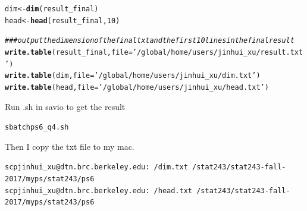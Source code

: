 \documentclass{article}\usepackage[]{graphicx}\usepackage[]{color}
\makeatletter
\newcommand{\hlnum}[1]{\textcolor[rgb]{0.686,0.059,0.569}{#1}}%
\newcommand{\hlstr}[1]{\textcolor[rgb]{0.192,0.494,0.8}{#1}}%
\newcommand{\hlcom}[1]{\textcolor[rgb]{0.678,0.584,0.686}{\textit{#1}}}%
\newcommand{\hlstd}[1]{\textcolor[rgb]{0.345,0.345,0.345}{#1}}%
\newcommand{\hlkwb}[1]{\textcolor[rgb]{0.69,0.353,0.396}{#1}}%
\newcommand{\hlkwc}[1]{\textcolor[rgb]{0.333,0.667,0.333}{#1}}%
\newcommand{\hlkwd}[1]{\textcolor[rgb]{0.737,0.353,0.396}{\textbf{#1}}}%
\newenvironment{kframe}{%
 \def\at@end@of@kframe{}%
 \ifinner\ifhmode%
  \def\at@end@of@kframe{\end{minipage}}%
  \begin{minipage}{\columnwidth}%
 \fi\fi%
 \def\FrameCommand##1{\hskip\@totalleftmargin \hskip-\fboxsep
 \colorbox{shadecolor}{##1}\hskip-\fboxsep
     \hskip-\linewidth \hskip-\@totalleftmargin \hskip\columnwidth}%
 \MakeFramed {\advance\hsize-\width
   \@totalleftmargin\z@ \linewidth\hsize
   \@setminipage}}%
 {\par\unskip\endMakeFramed%
 \at@end@of@kframe}
\newenvironment{knitrout}{}{} %
\makeatother
\begin{document}
\begin{knitrout}
\begin{kframe}
\begin{alltt}
\hlstd{dim}\hlkwb{<-}\hlkwd{dim}\hlstd{(result_final)}
\hlstd{head}\hlkwb{<-}\hlkwd{head}\hlstd{(result_final,}\hlnum{10}\hlstd{)}

\hlcom{###output the dimension of the final txt and the first 10 lines in the final result}
\hlkwd{write.table}\hlstd{(result_final,}\hlkwc{file}\hlstd{=}\hlstr{'/global/home/users/jinhui_xu/result.txt'}\hlstd{)}
\hlkwd{write.table}\hlstd{(dim,}\hlkwc{file}\hlstd{=}\hlstr{'/global/home/users/jinhui_xu/dim.txt'}\hlstd{)}
\hlkwd{write.table}\hlstd{(head,}\hlkwc{file}\hlstd{=}\hlstr{'/global/home/users/jinhui_xu/head.txt'}\hlstd{)}
\end{alltt}
\end{kframe}
\end{knitrout}

Run .sh in savio to get the result
\begin{knitrout}
\color{fgcolor}\begin{kframe}
\begin{alltt}
sbatch ps6_q4.sh
\end{alltt}
\end{kframe}
\end{knitrout}

Then I copy the txt file to my mac.
\begin{knitrout}
\color{fgcolor}\begin{kframe}
\begin{alltt}
scp jinhui_xu@dtn.brc.berkeley.edu:~/dim.txt ~/stat243/stat243-fall-2017/myps/stat243/ps6
scp jinhui_xu@dtn.brc.berkeley.edu:~/head.txt ~/stat243/stat243-fall-2017/myps/stat243/ps6
\end{alltt}
\end{kframe}
\end{knitrout}
\end{document}
